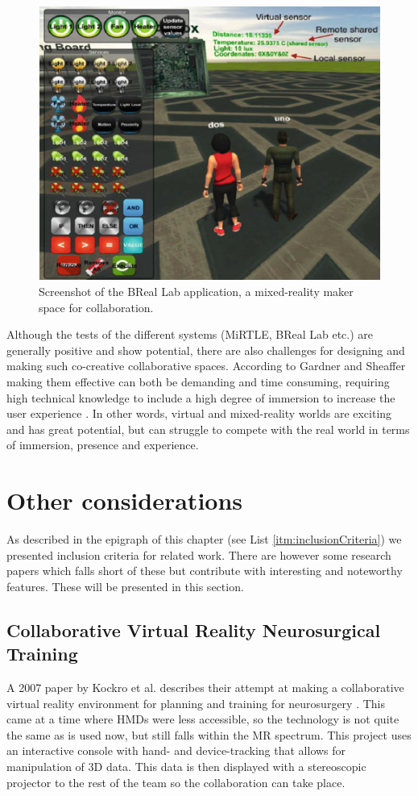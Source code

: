 \begin{figure}[!ht]
     \centering
     \includegraphics[width=.7\textwidth]{./fig/related_work/BReal.PNG}
     \captionsetup{width=0.6\linewidth}
     \caption{Screenshot of the BReal Lab application, a mixed-reality maker space for collaboration.}
     \label{fig:BReal}
 \end{figure}
 
 
 Although the tests of the different systems (MiRTLE, BReal Lab etc.) are generally positive and show  potential, there are also challenges for designing and making such co-creative collaborative spaces. According to Gardner and Sheaffer making them effective can both be demanding and time consuming, requiring high technical knowledge to include a high degree of immersion to increase the user experience \cite{gardner2017systems}. In other words, virtual and mixed-reality worlds are exciting and has great potential, but can struggle to compete with the real world in terms of immersion, presence and experience.          


\section{Other considerations}
As described in the epigraph of this chapter (see List \ref{itm:inclusionCriteria}) we presented inclusion criteria for related work. There are however some research papers which falls short of these but contribute with interesting and noteworthy features. These will be presented in this section.     

\subsection{Collaborative Virtual Reality Neurosurgical Training}
A 2007 paper by Kockro et al. describes their attempt at making a collaborative virtual reality environment for planning and training for neurosurgery \cite{kockro2007collaborative}. This came at a time where HMDs were less accessible, so the technology is not quite the same as is used now, but still falls within the MR spectrum. This project uses an interactive console with hand- and device-tracking that allows for manipulation of 3D data. This data is then displayed with a stereoscopic projector to the rest of the team so the collaboration can take place.

